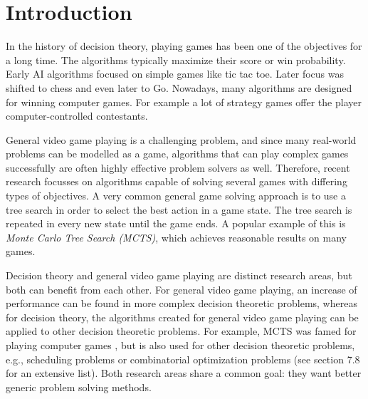 \chapter{Introduction}
\label{sec:introduction}






In the history of decision theory, playing games has been one of the objectives
for a long time. The algorithms typically maximize their score or win
probability. Early AI algorithms focused on simple games like tic tac toe.
Later focus was shifted to chess and even later to Go. Nowadays, many algorithms
are designed for winning computer games. For example a lot of strategy games
offer the player computer-controlled contestants. 

General video game playing is a challenging problem, and since many real-world
problems can be modelled as a game, algorithms that can play complex games
successfully are often highly effective problem solvers as well.
Therefore, recent research focusses on algorithms capable of solving several
games with differing types of objectives. A very common general game solving
approach is to use a tree search in order to select the best action in a game
state. The tree search is repeated in every new state until the game ends. A
popular example of this is \emph{Monte Carlo Tree Search (MCTS)}, which achieves
reasonable results on many games.

Decision theory and general video game playing are distinct research areas, but
both can benefit from each other. For general video game playing, an increase of
performance can be found in more complex decision theoretic problems, whereas
for decision theory, the algorithms created for general video game playing can
be applied to other decision theoretic problems. For example, MCTS was famed for
playing computer games \cite{gelly2006modification}, but is also used for other
decision theoretic problems, e.g., scheduling problems or combinatorial
optimization problems (see \cite{browne2012survey} section 7.8 for an extensive
list). Both research areas share a common goal: they want better generic problem
solving methods.

